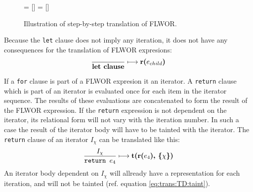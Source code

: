 \begin{figure}[h]
\centering
{}= []%
= [] %

\label{fig:trans:TD:flworExecute}
\caption[FLWOR translation order]{Illustration of step-by-step translation of FLWOR.}
\end{figure}

Because the \texttt{let} clause does not imply any iteration, it does not have any consequences for the
translation of FLWOR expresions:
\begin{equation}
\frac{}{\mbox{\textbf{let clause}}}\longmapsto \mbox{\textbf{r(}}e_{child}\mbox{\textbf{)}}
\label{rule:trans:TD:letclause}
\end{equation}

If a \texttt{for} clause is part of a FLWOR expresion it an iterator. A \texttt{return} clause which is part of an
iterator is evaluated once for each item in the iterator sequence. The results of these evaluations are
concatenated to form the result of the FLWOR expression. If the \texttt{return} expression is not dependent on the
iterator, its relational form will not vary with the iteration number. In such a case the result of the iterator
body will have to be tainted with the iterator. The \texttt{return} clause of an iterator $I_{\chi}$ can be
translated like this:
\begin{equation}
\frac{I_{\chi}}{\mbox{\texttt{return }}e_{4}}\longmapsto
\mbox{\textbf{t(r(}}e_{4}\mbox{\textbf{), \{}}\chi\mbox{\textbf{\})}}
\label{rule:trans:TD:returnTaint}
\end{equation}
An iterator body dependent on $I_{\chi}$ will allready have a representation for each iteration, and will not be
tainted (ref. equation \ref{eq:trans:TD:taint}).

